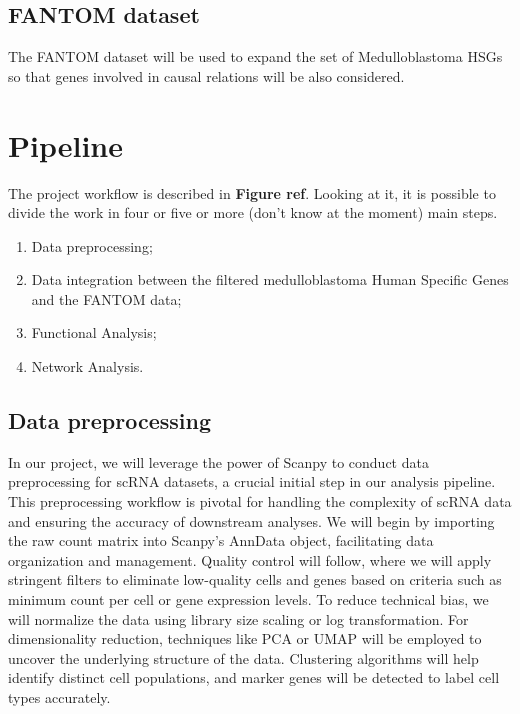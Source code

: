 \documentclass[10pt]{SelfArx} %
\begin{document}
\subsection{FANTOM dataset}\label{sec:Fantom_dataset}
The FANTOM \cite{fantom5} dataset will be used to expand the set of Medulloblastoma HSGs so that genes involved in causal relations will be also considered.

\section{Pipeline}\label{sec:pipeline}
The project workflow is described in \textbf{Figure ref}. Looking at it, it is possible to divide the work in four or five or more (don't know at the moment) main steps.

\begin{enumerate}
    \item Data preprocessing;
    \item Data integration between the filtered medulloblastoma Human Specific Genes and the FANTOM data;
    \item Functional Analysis;
    \item Network Analysis.
\end{enumerate}

\subsection{Data preprocessing}\label{sec:pre_processing}
In our project, we will leverage the power of Scanpy \cite{wolf2018scanpy} to conduct data preprocessing for scRNA datasets, a crucial initial step in our analysis pipeline. This preprocessing workflow is pivotal for handling the complexity of scRNA data and ensuring the accuracy of downstream analyses. We will begin by importing the raw count matrix into Scanpy's AnnData object, facilitating data organization and management. Quality control will follow, where we will apply stringent filters to eliminate low-quality cells and genes based on criteria such as minimum count per cell or gene expression levels. To reduce technical bias, we will normalize the data using library size scaling or log transformation. For dimensionality reduction, techniques like PCA or UMAP will be employed to uncover the underlying structure of the data. Clustering algorithms will help identify distinct cell populations, and marker genes will be detected to label cell types accurately. \\
\end{document}

